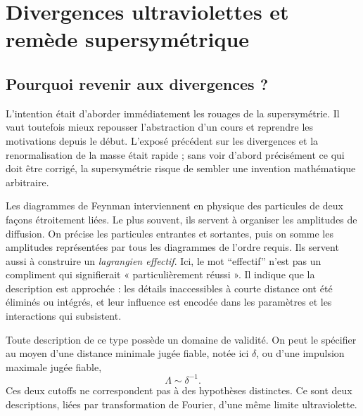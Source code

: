 \chapter{Divergences ultraviolettes et remède supersymétrique}


\section{Pourquoi revenir aux divergences ?}

L’intention était d’aborder immédiatement les rouages de la supersymétrie. Il vaut toutefois mieux repousser l’abstraction d’un cours et reprendre les motivations depuis le début. L’exposé précédent sur les divergences et la renormalisation de la masse était rapide ; sans voir d’abord précisément ce qui doit être corrigé, la supersymétrie risque de sembler une invention mathématique arbitraire.

Les diagrammes de Feynman interviennent en physique des particules de deux façons étroitement liées. Le plus souvent, ils servent à organiser les amplitudes de diffusion. On précise les particules entrantes et sortantes, puis on somme les amplitudes représentées par tous les diagrammes de l’ordre requis. Ils servent aussi à construire un \emph{lagrangien effectif}. Ici, le mot ``effectif'' n’est pas un compliment qui signifierait « particulièrement réussi ». Il indique que la description est approchée : les détails inaccessibles à courte distance ont été éliminés ou intégrés, et leur influence est encodée dans les paramètres et les interactions qui subsistent.

Toute description de ce type possède un domaine de validité. On peut le spécifier au moyen d’une distance minimale jugée fiable, notée ici \(\delta\), ou d’une impulsion maximale jugée fiable,
\begin{equation}
\Lambda\sim \delta^{-1}.
\end{equation}
Ces deux cutoffs ne correspondent pas à des hypothèses distinctes. Ce sont deux descriptions, liées par transformation de Fourier, d’une même limite ultraviolette.

